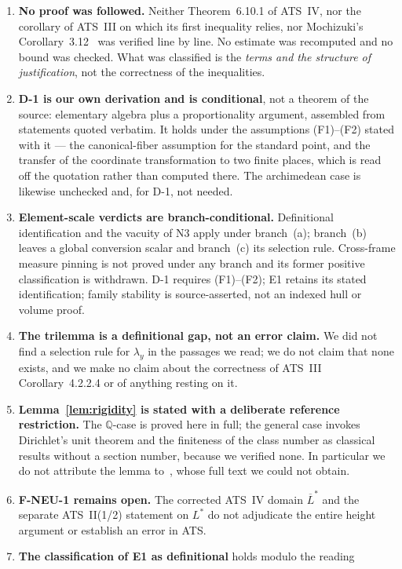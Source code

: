 \documentclass[11pt,a4paper]{article}
\theoremstyle{definition}
\theoremstyle{plain}
\theoremstyle{definition}
\begin{document}
\begin{enumerate}
\item \textbf{No proof was followed.} Neither Theorem~6.10.1 of ATS~IV, nor the
  corollary of ATS~III on which its first inequality relies, nor Mochizuki's
  Corollary~3.12~\cite{Mochizuki2021c} was verified line by line. No estimate was
  recomputed and no bound was checked. What was classified is the \emph{terms and
  the structure of justification}, not the correctness of the inequalities.
\item \textbf{D-1 is our own derivation and is conditional}, not a theorem of the
  source: elementary algebra plus a proportionality argument, assembled from
  statements quoted verbatim. It holds under the assumptions (F1)--(F2) stated with
  it --- the canonical-fiber assumption for the standard point, and the transfer of
  the coordinate transformation to two finite places, which is read off the
  quotation rather than computed there. The archimedean case is likewise unchecked
  and, for D-1, not needed.
\item \textbf{Element-scale verdicts are branch-conditional.}
  Definitional identification and the vacuity of N3 apply under branch~(a);
  branch~(b) leaves a global conversion scalar and branch~(c) its selection rule.
  Cross-frame measure pinning is not proved under any branch and its former
  positive classification is withdrawn. D-1 requires (F1)--(F2); E1 retains
  its stated identification; family stability is source-asserted, not an
  indexed hull or volume proof.
\item \textbf{The trilemma is a definitional gap, not an error claim.} We did not
  find a selection rule for $\lambda_y$ in the passages we read; we do not claim
  that none exists, and we make no claim about the correctness of ATS~III
  Corollary~4.2.2.4 or of anything resting on it.
\item \textbf{Lemma~\ref{lem:rigidity} is stated with a deliberate reference
  restriction.} The $\mathbb{Q}$-case is proved here in full; the general case
  invokes Dirichlet's unit theorem and the finiteness of the class number as
  classical results without a section number, because we verified none. In
  particular we do not attribute the lemma to~\cite{ArtinWhaples1945}, whose full
  text we could not obtain.
\item \textbf{F-NEU-1 remains open.} The corrected ATS~IV domain
  $\overline L^*$ and the separate ATS~II(1/2) statement on $L^*$ do not
  adjudicate the entire height argument or establish an error in ATS.
\item \textbf{The classification of E1 as definitional} holds modulo the reading

\end{enumerate}
\end{document}
